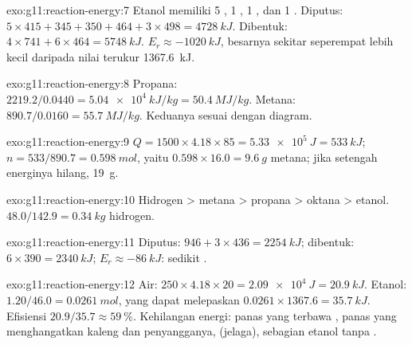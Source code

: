 \begin{solution}{exo:g11:reaction-energy:7}
Etanol  memiliki 5 , 1 , 1 ,
dan 1 . Diputus: $5 \times 415 + 345 + 350 + 464 + 3 \times 498 =
\qty{4728}{kJ}$. Dibentuk: $4 \times 741 + 6 \times 464 = \qty{5748}{kJ}$.
$E_r \approx \qty{-1020}{kJ}$, besarnya sekitar seperempat lebih kecil
daripada nilai terukur \qty{1367.6}{kJ}.
\end{solution}

\begin{solution}{exo:g11:reaction-energy:8}
Propana: $2219.2 / 0.0440 = \qty{5.04e4}{kJ/kg} = \qty{50.4}{MJ/kg}$.
Metana: $890.7 / 0.0160 = \qty{55.7}{MJ/kg}$. Keduanya sesuai dengan
diagram.
\end{solution}

\begin{solution}{exo:g11:reaction-energy:9}
$Q = 1500 \times 4.18 \times 85 = \qty{5.33e5}{J} = \qty{533}{kJ}$;
$n = 533 / 890.7 = \qty{0.598}{mol}$, yaitu $0.598 \times 16.0 =
\qty{9.6}{g}$ metana; jika setengah energinya hilang, \qty{19}{g}.
\end{solution}

\begin{solution}{exo:g11:reaction-energy:10}
Hidrogen > metana > propana > oktana > etanol.
$48.0 / 142.9 = \qty{0.34}{kg}$ hidrogen.
\end{solution}

\begin{solution}{exo:g11:reaction-energy:11}
Diputus: $946 + 3 \times 436 = \qty{2254}{kJ}$; dibentuk:
$6 \times 390 = \qty{2340}{kJ}$; $E_r \approx \qty{-86}{kJ}$: sedikit
.
\end{solution}

\begin{solution}{exo:g11:reaction-energy:12}
Air: $250 \times 4.18 \times 20 = \qty{2.09e4}{J} = \qty{20.9}{kJ}$.
Etanol: $1.20 / 46.0 = \qty{0.0261}{mol}$, yang dapat melepaskan
$0.0261 \times 1367.6 = \qty{35.7}{kJ}$. Efisiensi
$20.9 / 35.7 \approx \qty{59}{\percent}$. Kehilangan energi: panas yang
terbawa , panas yang menghangatkan kaleng dan penyangganya,
 (jelaga), sebagian etanol  tanpa
.
\end{solution}

